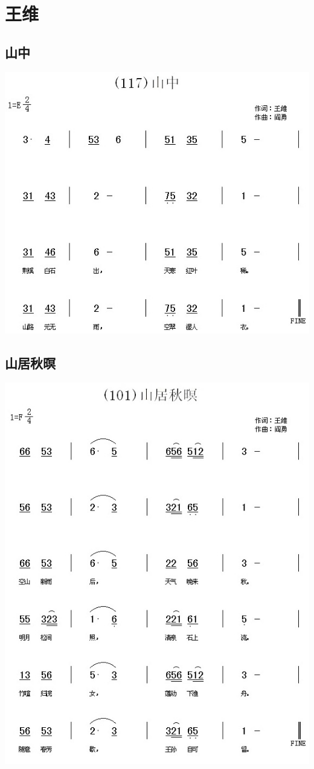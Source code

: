 \documentclass[cn,pad,twocol]{elegantbook}
\begin{document}
\chapter{王维}
\section{山中}      \includegraphics[width=\textwidth]{dongxiao/20200627-王维-山中.jpg}  
\section{山居秋暝}  \includegraphics[width=\textwidth]{dongxiao/20200627-王维-山居秋暝.jpg} 
\end{document}
